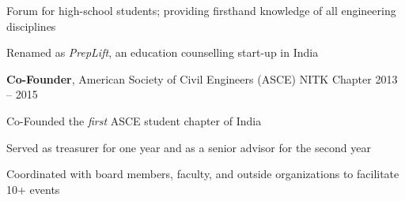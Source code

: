 \par
\begin{list2}
\item Forum for high-school students; providing firsthand knowledge of all engineering disciplines
\item Renamed as {\em PrepLift}, an education counselling start-up in India
\end{list2}\vspace*{-0.05in}
\vspace{1.5ex}
{{\bf Co-Founder}, American Society of Civil Engineers (ASCE) NITK Chapter} {\hfill\color{muted} 2013 -- 2015}\par
\begin{list2}
\item Co-Founded the \textit{first} ASCE student chapter of India 
\item Served as treasurer for one year and as a senior advisor for the second year
\item Coordinated with board members, faculty, and outside organizations to facilitate 10+ events 
\end{list2}\vspace*{-0.05in} 

